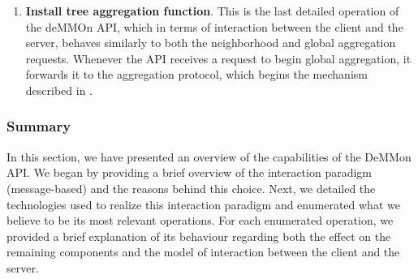 \begin{enumerate}
    \item \textbf{Install tree aggregation function}. This is the last detailed operation of the deMMOn API, which in terms of interaction between the client and the server, behaves similarly to both the neighborhood and global aggregation requests. Whenever the API receives a request to begin global aggregation, it forwards it to the aggregation protocol, which begins the mechanism described in .
\end{enumerate}

\subsubsection{Summary}

In this section, we have presented an overview of the capabilities of the DeMMon API. We began by providing a brief overview of the interaction paradigm (message-based) and the reasons behind this choice. Next, we detailed the technologies used to realize this interaction paradigm and enumerated what we believe to be its most relevant operations. For each enumerated operation, we provided a brief explanation of its behaviour regarding both the effect on the remaining components and the model of interaction between the client and the server. 